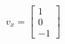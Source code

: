 \documentclass[preview]{standalone}
\begin{document}
\begin{align*}
v_x=\begin{bmatrix}
                        1\\
                        0\\
                        -1
                        \end{bmatrix}\\
\end{align*}
\end{document}

